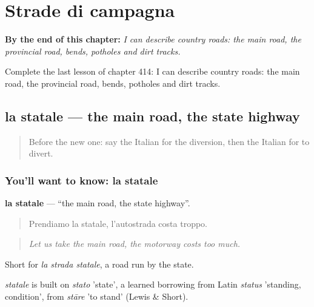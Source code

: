 
\chapter{Strade di campagna}
\label{ch:it-strade-di-campagna}

\begin{chapteropening}
\textbf{By the end of this chapter:} \emph{I can describe country roads: the main road, the provincial road, bends, potholes and dirt tracks.}

Complete the last lesson of chapter 414: I can describe country roads: the main road, the provincial road, bends, potholes and dirt tracks.
\end{chapteropening}

\section[la statale]{la statale — the main road, the state highway}

\label{lesson:IT-C414-statale}



\begin{quote}
Before the new one: say the Italian for the diversion, then the Italian for to divert.
\end{quote}

\subsection*{You'll want to know: la statale}
\textbf{la statale} — \textquotedblleft{}the main road, the state highway\textquotedblright{}.

\begin{quote}
Prendiamo la statale, l'autostrada costa troppo.
\end{quote}

\begin{quote}
\emph{Let us take the main road, the motorway costs too much.}
\end{quote}

Short for \emph{la strada statale}, a road run by the state.

\begin{cousinweb}
\emph{statale} is built on \emph{stato} 'state', a learned borrowing from Latin \emph{status} 'standing, condition', from \emph{stāre} 'to stand' (Lewis \& Short).
\end{cousinweb}

